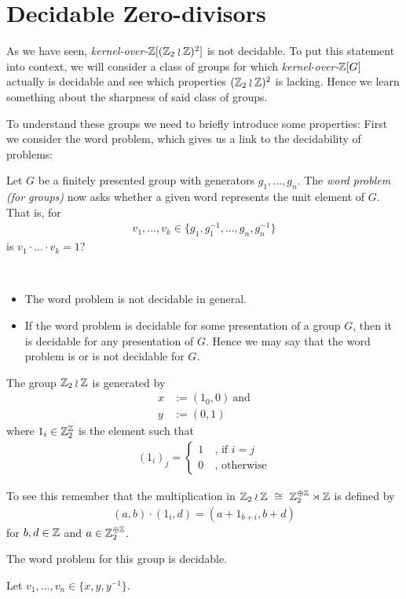 \section{Decidable Zero-divisors}

As we have seen, \emph{kernel-over-$\mathbb{Z}[(\mathbb{Z}_2 \wr \mathbb{Z})^2]$} is not decidable.
To put this statement into context, we will consider a class of groups for which \emph{kernel-over-$\mathbb{Z}[G]$} actually is decidable and see which properties $(\mathbb{Z}_2 \wr \mathbb{Z})^2$ is lacking.
Hence we learn something about the sharpness of said class of groups.

To understand these groups we need to briefly introduce some properties: First we consider the word problem, which gives us a link to the decidability of problems:

\begin{Definition}
	Let $G$ be a finitely presented group with generators $g_1,...,g_n$.
	The \emph{word problem (for groups)} now asks whether a given word represents the unit element of $G$. That is, for
	\begin{align*}
		v_1,...,v_k \in \{g_1,g_1^{-1},...,g_n,g_n^{-1}\}
	\end{align*}
	is $v_1 \cdot ... \cdot v_k = 1$?
\end{Definition}

\begin{Remark}
	\
	\begin{itemize}
		\item The word problem is not decidable in general. %
		\item If the word problem is decidable for some presentation of a group $G$, then it is decidable for any presentation of $G$.
			Hence we may say that the word problem is or is not decidable for $G$.
	\end{itemize}
\end{Remark}

\begin{Example}
	The group $\mathbb{Z}_2 \wr \mathbb{Z}$ is generated by
	\begin{align*}
		x &:= (1_0,0) ~\text{and} \\
		y &:= (0,1)
	\end{align*}
	where $1_i \in \mathbb{Z}_2^{\mathbb{Z}}$ is the element such that
	\begin{align*}
		 (1_i)_j = \begin{cases} 1~ &\text{, if $i = j$} \\ 0~ &\text{, otherwise} \end{cases}
	\end{align*}

	To see this remember that the multiplication in $\mathbb{Z}_2 \wr \mathbb{Z} ~\cong~ \mathbb{Z}_2^{\oplus \mathbb{Z}} \rtimes \mathbb{Z}$ is defined by
	\begin{align*}
		(a,b) \cdot (1_i,d) = (a + 1_{b+i}, b+d)
	\end{align*}
	for $b,d \in \mathbb{Z}$ and $a \in \mathbb{Z}_2^{\oplus \mathbb{Z}}$.

	The word problem for this group is decidable.
\end{Example}
\proof
	Let $v_1,...,v_n \in \{x,y,y^{-1}\}$.

